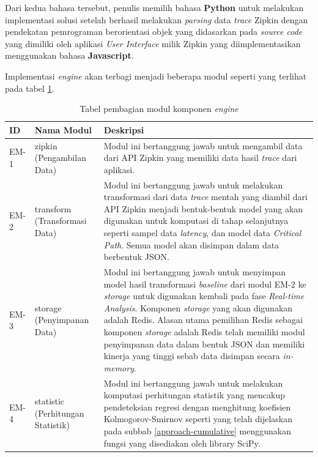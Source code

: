 Dari kedua bahasa tersebut, penulis memilih bahasa \textbf{Python} untuk melakukan implementasi solusi setelah berhasil melakukan \textit{parsing} data \textit{trace} Zipkin dengan pendekatan pemrograman berorientasi objek yang didasarkan pada \textit{source code} yang dimiliki oleh aplikasi \textit{User Interface} milik Zipkin yang diimplementasikan menggunakan bahasa \textbf{Javascript}. 

Implementasi \textit{engine} akan terbagi menjadi beberapa modul seperti yang terlihat pada tabel \ref{engine-module}.

\begin{small}
	\begin{longtable}{ | p{1cm} | p{3cm} | p{10cm} | }
		\caption{Tabel pembagian modul komponen \textit{engine}}
		\label{engine-module}                                                           
		\\ \hline
		\centering\bfseries{ID} & \centering\bfseries{Nama Modul} & \centering\bfseries{Deskripsi} \tabularnewline \hline
		\endfirsthead
		EM-1 & zipkin (Pengambilan Data) & Modul ini bertanggung jawab untuk mengambil data dari API Zipkin yang memiliki data hasil \textit{trace} dari aplikasi. \\ \hline
		EM-2 & transform (Transformasi Data) & Modul ini bertanggung jawab untuk melakukan transformasi dari data \textit{trace} mentah yang diambil dari API Zipkin menjadi bentuk-bentuk model yang akan digunakan untuk komputasi di tahap selanjutnya seperti sampel data \textit{latency}, dan model data \textit{Critical Path}. Semua model akan disimpan dalam data berbentuk JSON. \\ \hline
		EM-3 & storage (Penyimpanan Data) & Modul ini bertanggung jawab untuk menyimpan model hasil transformasi \textit{baseline} dari modul EM-2 ke \textit{storage} untuk digunakan kembali pada fase \textit{Real-time Analysis}. Komponen \textit{storage} yang akan digunakan adalah Redis. Alasan utama pemilihan Redis sebagai komponen \textit{storage} adalah Redis telah memiliki modul penyimpanan data dalam bentuk JSON dan memiliki kinerja yang tinggi sebab data disimpan secara \textit{in-memory}. \\ \hline
		EM-4 & statistic (Perhitungan Statistik) & Modul ini bertanggung jawab untuk melakukan komputasi perhitungan statistik yang mencakup pendeteksian regresi dengan menghitung koefisien Kolmogorov-Smirnov seperti yang telah dijelaskan pada subbab \ref{approach-cumulative} menggunakan fungsi yang disediakan oleh library SciPy. \\ \hline

\end{longtable}
\end{small}
